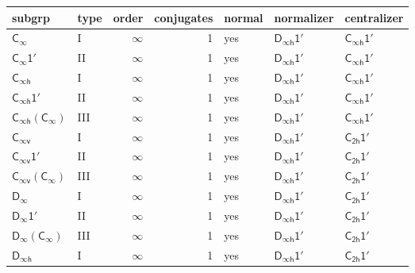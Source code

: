 \documentclass[10pt,a4paper]{article}
\numberwithin{equation}{section}
\newcommand{\grp}[1]{\mathsf{#1}}
\begin{document}
{\small\begin{longtable}{@{}llrrlll@{}}\toprule
subgrp & type & order & conjugates & normal & normalizer & centralizer\\\midrule\endhead
\bottomrule\endfoot\endlastfoot
\href{../../../rotation/data/pdf/Cinf.pdf}{$\grp{C_{\infty}}$} & I & $\infty$ & 1 & yes & \href{Dinfh-1p.pdf}{$\grp{D_{\infty h}1'}$} & \href{Cinfh-1p.pdf}{$\grp{C_{\infty h}1'}$}\\*
\href{Cinf-1p.pdf}{$\grp{C_{\infty}1'}$} & II & $\infty$ & 1 & yes & \href{Dinfh-1p.pdf}{$\grp{D_{\infty h}1'}$} & \href{Cinfh-1p.pdf}{$\grp{C_{\infty h}1'}$}\\
\href{../../../rotation/data/pdf/Cinfh.pdf}{$\grp{C_{\infty h}}$} & I & $\infty$ & 1 & yes & \href{Dinfh-1p.pdf}{$\grp{D_{\infty h}1'}$} & \href{Cinfh-1p.pdf}{$\grp{C_{\infty h}1'}$}\\
\href{Cinfh-1p.pdf}{$\grp{C_{\infty h}1'}$} & II & $\infty$ & 1 & yes & \href{Dinfh-1p.pdf}{$\grp{D_{\infty h}1'}$} & \href{Cinfh-1p.pdf}{$\grp{C_{\infty h}1'}$}\\
\href{Cinfh-Cinf.pdf}{$\grp{C_{\infty h}}(\grp{C_{\infty}})$} & III & $\infty$ & 1 & yes & \href{Dinfh-1p.pdf}{$\grp{D_{\infty h}1'}$} & \href{Cinfh-1p.pdf}{$\grp{C_{\infty h}1'}$}\\
\href{../../../rotation/data/pdf/Cinfv.pdf}{$\grp{C_{\infty v}}$} & I & $\infty$ & 1 & yes & \href{Dinfh-1p.pdf}{$\grp{D_{\infty h}1'}$} & \href{C2h-1p.pdf}{$\grp{C_{2h}1'}$}\\
\href{Cinfv-1p.pdf}{$\grp{C_{\infty v}1'}$} & II & $\infty$ & 1 & yes & \href{Dinfh-1p.pdf}{$\grp{D_{\infty h}1'}$} & \href{C2h-1p.pdf}{$\grp{C_{2h}1'}$}\\
\href{Cinfv-Cinf.pdf}{$\grp{C_{\infty v}}(\grp{C_{\infty}})$} & III & $\infty$ & 1 & yes & \href{Dinfh-1p.pdf}{$\grp{D_{\infty h}1'}$} & \href{C2h-1p.pdf}{$\grp{C_{2h}1'}$}\\
\href{../../../rotation/data/pdf/Dinf.pdf}{$\grp{D_{\infty}}$} & I & $\infty$ & 1 & yes & \href{Dinfh-1p.pdf}{$\grp{D_{\infty h}1'}$} & \href{C2h-1p.pdf}{$\grp{C_{2h}1'}$}\\
\href{Dinf-1p.pdf}{$\grp{D_{\infty}1'}$} & II & $\infty$ & 1 & yes & \href{Dinfh-1p.pdf}{$\grp{D_{\infty h}1'}$} & \href{C2h-1p.pdf}{$\grp{C_{2h}1'}$}\\
\href{Dinf-Cinf.pdf}{$\grp{D_{\infty}}(\grp{C_{\infty}})$} & III & $\infty$ & 1 & yes & \href{Dinfh-1p.pdf}{$\grp{D_{\infty h}1'}$} & \href{C2h-1p.pdf}{$\grp{C_{2h}1'}$}\\
\href{../../../rotation/data/pdf/Dinfh.pdf}{$\grp{D_{\infty h}}$} & I & $\infty$ & 1 & yes & \href{Dinfh-1p.pdf}{$\grp{D_{\infty h}1'}$} & \href{C2h-1p.pdf}{$\grp{C_{2h}1'}$}\\

\end{longtable}}
\end{document}
